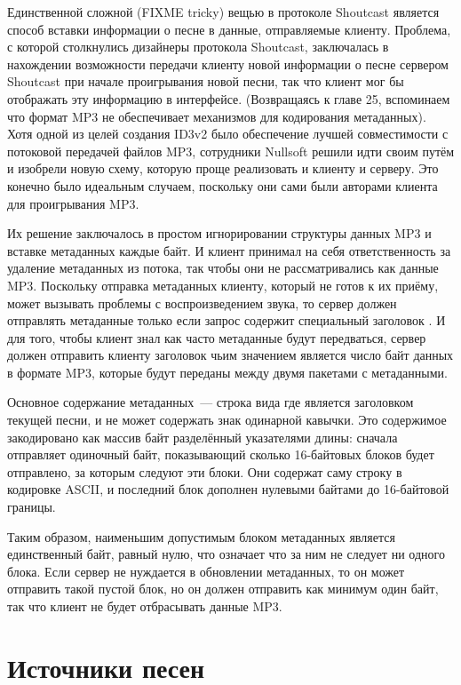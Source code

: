Единственной сложной (FIXME tricky) вещью в протоколе Shoutcast является способ вставки
информации о песне в данные, отправляемые клиенту.  Проблема, с которой столкнулись
дизайнеры протокола Shoutcast, заключалась в нахождении возможности передачи клиенту новой
информации о песне сервером Shoutcast при начале проигрывания новой песни, так что клиент
мог бы отображать эту информацию в интерфейсе. (Возвращаясь к главе 25, вспоминаем что
формат MP3 не обеспечивает механизмов для кодирования метаданных).  Хотя одной из целей
создания ID3v2 было обеспечение лучшей совместимости с потоковой передачей файлов MP3,
сотрудники Nullsoft решили идти своим путём и изобрели новую схему, которую проще
реализовать и клиенту и серверу.  Это конечно было идеальным случаем, поскольку они сами
были авторами клиента для проигрывания MP3.

Их решение заключалось в простом игнорировании структуры данных MP3 и вставке метаданных
каждые  байт.  И клиент принимал на себя ответственность за удаление метаданных из
потока, так чтобы они не рассматривались как данные MP3.  Поскольку отправка метаданных
клиенту, который не готов к их приёму, может вызывать проблемы с воспроизведением звука,
то сервер должен отправлять метаданные только если запрос содержит специальный заголовок
.  И для того, чтобы клиент знал как часто метаданные будут
передваться, сервер должен отправить клиенту заголовок  чьим значением
является число байт данных в формате MP3, которые будут переданы между двумя пакетами с
метаданными.

Основное содержание метаданных~--- строка вида  где 
является заголовком текущей песни, и не может содержать знак одинарной кавычки.  Это
содержимое закодировано как массив байт разделённый указателями длины: сначала отправляет
одиночный байт, показывающий сколько 16-байтовых блоков будет отправлено, за которым
следуют эти блоки.  Они содержат саму строку в кодировке ASCII, и последний блок дополнен
нулевыми байтами до 16-байтовой границы.

Таким образом, наименьшим допустимым блоком метаданных является единственный байт, равный
нулю, что означает что за ним не следует ни одного блока.  Если сервер не нуждается в
обновлении метаданных, то он может отправить такой пустой блок, но он должен отправить как
минимум один байт, так что клиент не будет отбрасывать данные MP3.

\section{Источники песен}

